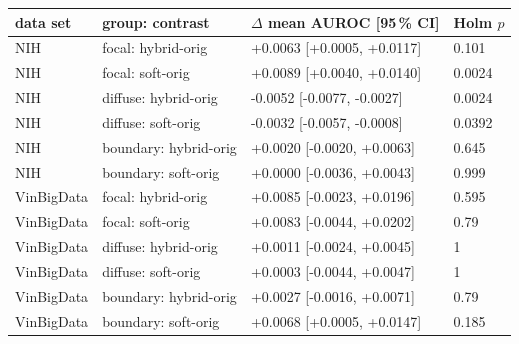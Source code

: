 \begin{tabular}{llll}
\toprule
data set & group: contrast & $\Delta$ mean AUROC [95\,\% CI] & Holm $p$ \\
\midrule
NIH & focal: hybrid-orig & +0.0063 [+0.0005, +0.0117] & 0.101 \\
NIH & focal: soft-orig & +0.0089 [+0.0040, +0.0140] & 0.0024 \\
NIH & diffuse: hybrid-orig & -0.0052 [-0.0077, -0.0027] & 0.0024 \\
NIH & diffuse: soft-orig & -0.0032 [-0.0057, -0.0008] & 0.0392 \\
NIH & boundary: hybrid-orig & +0.0020 [-0.0020, +0.0063] & 0.645 \\
NIH & boundary: soft-orig & +0.0000 [-0.0036, +0.0043] & 0.999 \\
VinBigData & focal: hybrid-orig & +0.0085 [-0.0023, +0.0196] & 0.595 \\
VinBigData & focal: soft-orig & +0.0083 [-0.0044, +0.0202] & 0.79 \\
VinBigData & diffuse: hybrid-orig & +0.0011 [-0.0024, +0.0045] & 1 \\
VinBigData & diffuse: soft-orig & +0.0003 [-0.0044, +0.0047] & 1 \\
VinBigData & boundary: hybrid-orig & +0.0027 [-0.0016, +0.0071] & 0.79 \\
VinBigData & boundary: soft-orig & +0.0068 [+0.0005, +0.0147] & 0.185 \\
\bottomrule
\end{tabular}

